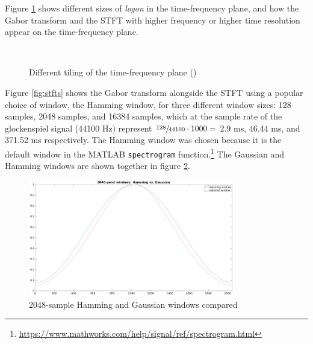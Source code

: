 \documentclass[report.tex]{subfiles}
\begin{document}
Figure \ref{fig:gabortf} shows different sizes of \textit{logon} in the time-frequency plane, and how the Gabor transform and the STFT with higher frequency or higher time resolution appear on the time-frequency plane.

\begin{figure}[ht]
	\centering
	\\
	\caption{Different tiling of the time-frequency plane (\cite{gabordiagrams})}
	\label{fig:gabortf}
\end{figure}

Figure \ref{fig:stfts} shows the Gabor transform alongside the STFT using a popular choice of window, the Hamming window, for three different window sizes: 128 samples, 2048 samples, and 16384 samples, which at the sample rate of the glockenspiel signal (44100 Hz) represent $\sfrac{128}{44100}\cdot 1000 = $ 2.9 ms, 46.44 ms, and 371.52 ms respectively. The Hamming window was chosen because it is the default window in the MATLAB \Verb#spectrogram# function.\footnote{\url{https://www.mathworks.com/help/signal/ref/spectrogram.html}} The Gaussian and Hamming windows are shown together in figure \ref{fig:gaussvshamm}.

\begin{figure}[ht]
	\centering
	\includegraphics[width=0.8\textwidth]{./images-tftheory/gaussianvshamming.png}
	\caption{2048-sample Hamming and Gaussian windows compared}
	\label{fig:gaussvshamm}
\end{figure}
\end{document}
